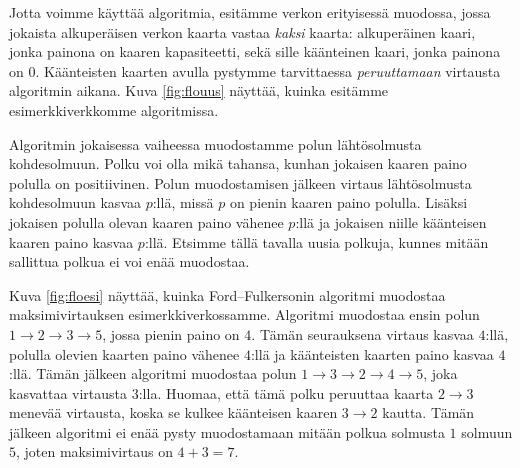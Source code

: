 Jotta voimme käyttää algoritmia, esitämme verkon
erityisessä muodossa, jossa jokaista alkuperäisen verkon
kaarta vastaa \emph{kaksi} kaarta:
alkuperäinen kaari, jonka painona on kaaren kapasiteetti,
sekä sille kään\-teinen kaari, jonka painona on $0$.
Käänteisten kaarten avulla pystymme tarvittaessa \emph{peruuttamaan}
virtausta algoritmin aikana.
Kuva \ref{fig:flouus} näyttää, kuinka esitämme esimerkkiverkkomme algoritmissa.

Algoritmin jokaisessa vaiheessa muodostamme polun
lähtösolmusta kohdesolmuun.
Polku voi olla mikä tahansa, kunhan jokaisen kaaren paino
polulla on positiivinen.
Polun muodostamisen jälkeen virtaus lähtösolmusta kohdesolmuun
kasvaa $p$:llä, missä $p$ on pienin kaaren paino polulla.
Lisäksi jokaisen polulla olevan kaaren paino vähenee $p$:llä
ja jokaisen niille käänteisen kaaren paino kasvaa $p$:llä.
Etsimme tällä tavalla uusia polkuja, kunnes mitään sallittua
polkua ei voi enää muodostaa.

Kuva \ref{fig:floesi} näyttää, kuinka Ford–Fulkersonin algoritmi muodostaa
maksimivirtauksen esimerkkiverkossamme.
Algoritmi muodostaa ensin polun $1 \rightarrow 2 \rightarrow 3 \rightarrow 5$,
jossa pienin paino on $4$.
Tämän seurauksena virtaus kasvaa $4$:llä,
polulla olevien kaarten paino vähenee $4$:llä
ja käänteisten kaarten paino kasvaa $4$:llä.
Tämän jälkeen algoritmi muodostaa polun
$1 \rightarrow 3 \rightarrow 2 \rightarrow 4 \rightarrow 5$,
joka kasvattaa virtausta $3$:lla.
Huomaa, että tämä polku peruuttaa
kaarta $2 \rightarrow 3$ menevää virtausta,
koska se kulkee käänteisen kaaren $3 \rightarrow 2$ kautta.
Tämän jälkeen algoritmi ei enää pysty muodostamaan mitään polkua
solmusta $1$ solmuun $5$, joten maksimivirtaus on $4+3=7$.

